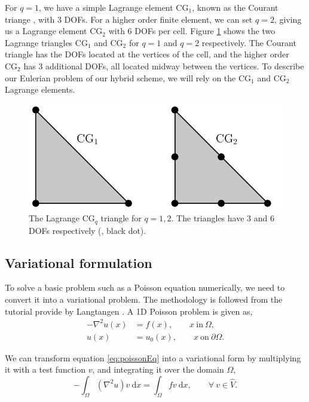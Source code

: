 For $q=1$, we have a simple Lagrange element $\mathrm{CG}_1$, known as the Courant triange \cite{Courant1943}, with $3$ DOFs. For a higher order finite element, we can set $q=2$, giving us a Lagrange element $\mathrm{CG}_2$ with $6$ DOFs per cell. Figure \ref{fig:continuousGalerkin} shows the two Lagrange triangles $\mathrm{CG}_1$ and $\mathrm{CG}_2$ for $q = 1$ and $q=2$ respectively. The Courant triangle has the DOFs located at the vertices of the cell, and the higher order $\mathrm{CG}_2$ has $3$ additional DOFs, all located midway between the vertices. To describe our Eulerian problem of our hybrid scheme, we will rely on the $\mathrm{CG}_1$ and $\mathrm{CG}_2$ Lagrange elements.

	\begin{figure}[t]
	\centering
	\includegraphics[width=0.6\linewidth]{./figures/eulerian/continuousGalerkin.pdf}
	\caption{The Lagrange $\mathrm{CG}_q$ triangle for $q = 1, 2$. The triangles have $3$ and $6$ DOFs respectively ({\color{black}{$\bullet$}}, black dot).}
	\label{fig:continuousGalerkin}
	\end{figure}



\subsection*{Variational formulation}
\label{subsec:variationalProblem}

To solve a basic problem such as a Poisson equation numerically, we need to convert it into a variational problem. The methodology is followed from the \fenics tutorial provide by Langtangen \cite{Logg2012b}. A 1D Poisson problem is given as,
	\begin{equation}
	\begin{aligned}
	- \nabla^2 u(x) &= f(x), \qquad x\ \mathrm{in}\ \Omega,\\
	u(x) &= u_0(x), \qquad x\ \mathrm{on}\ \partial\Omega.
	\end{aligned}
	\label{eq:poissonEq}
	\end{equation}
	
We can transform equation \ref{eq:poissonEq} into a variational form by multiplying it with a test function $v$, and integrating it over the domain $\Omega$,
	\begin{equation}
	- \int_{\Omega} \left(\nabla^2 u\right)v\ \mathrm{d}x= \int_{\Omega} fv\ \mathrm{d}x, \qquad \forall\ v \in \hat{V}.
	\label{eq:poissonEqVariationFormA}
	\end{equation}

